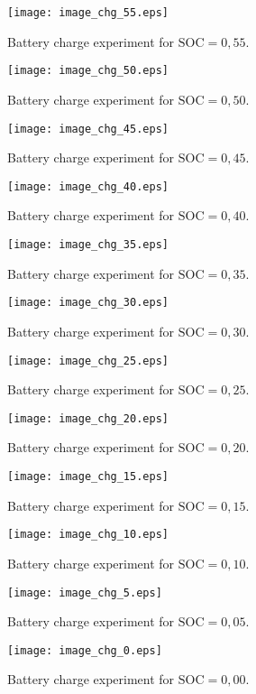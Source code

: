 \begin{figure}[h!]
	\centering
  	\texttt{[image: image\_chg\_55.eps]}
	\caption{Battery charge experiment for $\mathrm{SOC} = 0,55$.}
	\label{fig:image_dis_55}
\end{figure}
\begin{figure}[h!]
	\centering
  	\texttt{[image: image\_chg\_50.eps]}
	\caption{Battery charge experiment for $\mathrm{SOC} = 0,50$.}
	\label{fig:image_dis_50}
\end{figure}
\begin{figure}[h!]
	\centering
  	\texttt{[image: image\_chg\_45.eps]}
	\caption{Battery charge experiment for $\mathrm{SOC} = 0,45$.}
	\label{fig:image_dis_45}
\end{figure}
\begin{figure}[h!]
	\centering
  	\texttt{[image: image\_chg\_40.eps]}
	\caption{Battery charge experiment for $\mathrm{SOC} = 0,40$.}
	\label{fig:image_dis_40}
\end{figure}
\begin{figure}[h!]
	\centering
  	\texttt{[image: image\_chg\_35.eps]}
	\caption{Battery charge experiment for $\mathrm{SOC} = 0,35$.}
	\label{fig:image_dis_35}
\end{figure}
\begin{figure}[h!]
	\centering
  	\texttt{[image: image\_chg\_30.eps]}
	\caption{Battery charge experiment for $\mathrm{SOC} = 0,30$.}
	\label{fig:image_dis_30}
\end{figure}
\begin{figure}[h!]
	\centering
  	\texttt{[image: image\_chg\_25.eps]}
	\caption{Battery charge experiment for $\mathrm{SOC} = 0,25$.}
	\label{fig:image_dis_25}
\end{figure}
\begin{figure}[h!]
	\centering
  	\texttt{[image: image\_chg\_20.eps]}
	\caption{Battery charge experiment for $\mathrm{SOC} = 0,20$.}
	\label{fig:image_dis_20}
\end{figure}
\begin{figure}[h!]
	\centering
  	\texttt{[image: image\_chg\_15.eps]}
	\caption{Battery charge experiment for $\mathrm{SOC} = 0,15$.}
	\label{fig:image_dis_15}
\end{figure}
\begin{figure}[h!]
	\centering
  	\texttt{[image: image\_chg\_10.eps]}
	\caption{Battery charge experiment for $\mathrm{SOC} = 0,10$.}
	\label{fig:image_dis_10}
\end{figure}
\begin{figure}[h!]
	\centering
  	\texttt{[image: image\_chg\_5.eps]}
	\caption{Battery charge experiment for $\mathrm{SOC} = 0,05$.}
	\label{fig:image_dis_5}
\end{figure}
\begin{figure}[h!]
	\centering
  	\texttt{[image: image\_chg\_0.eps]}
	\caption{Battery charge experiment for $\mathrm{SOC} = 0,00$.}
	\label{fig:image_dis_0}
\end{figure}

